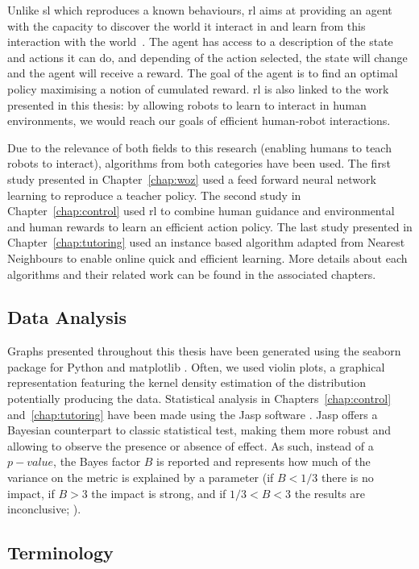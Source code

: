 Unlike \gls{sl} which reproduces a known behaviours, \gls{rl} aims at providing an agent with the capacity to discover the world it interact in and learn from this interaction with the world~\citep{sutton1998reinforcement}. The agent has access to a description of the state and actions it can do, and depending of the action selected, the state will change and the agent will receive a reward. The goal of the agent is to find an optimal policy maximising a notion of cumulated reward. \gls{rl} is also linked to the work presented in this thesis: by allowing robots to learn to interact in human environments, we would reach our goals of efficient human-robot interactions.

Due to the relevance of both fields to this research (enabling humans to teach robots to interact), algorithms from both categories have been used. The first study presented in Chapter~\ref{chap:woz} used a feed forward neural network learning to reproduce a teacher policy. The second study in Chapter~\ref{chap:control} used \gls{rl} to combine human guidance and environmental and human rewards to learn an efficient action policy. The last study presented in Chapter~\ref{chap:tutoring} used an instance based algorithm adapted from Nearest Neighbours to enable online quick and efficient learning. More details about each algorithms and their related work can be found in the associated chapters.

\subsection{Data Analysis}
Graphs presented throughout this thesis have been generated using the seaborn package for Python and matplotlib \cite{waskom2017seaborn}. Often, we used violin plots, a graphical representation featuring the kernel density estimation of the distribution potentially producing the data. Statistical analysis in Chapters~\ref{chap:control} and~\ref{chap:tutoring} have been made using the Jasp software \cite{jasp2018}. Jasp offers a Bayesian counterpart to classic statistical test, making them more robust and allowing to observe the presence or absence of effect. As such, instead of a $p-value$, the Bayes factor $B$ is reported and represents how much of the variance on the metric is explained by a parameter (if $B < 1/3$ there is no impact, if $B > 3$ the impact is strong, and if $1/3<B<3$ the results are inconclusive; \citealt{jeffreys1998theory,dienes2011bayesian}). 

\subsection{Terminology}

